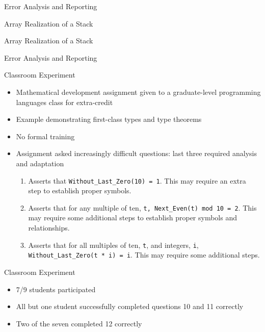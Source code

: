 \begin{frame}{Error Analysis and Reporting}
~
\end{frame}


\begin{frame}{Array Realization of a Stack}
	
\end{frame}

\begin{frame}{Array Realization of a Stack}
	
\end{frame}

\begin{frame}{Error Analysis and Reporting}
~
\end{frame}


\begin{frame}{Classroom Experiment}
	\begin{itemize}
		\item Mathematical development assignment given to a graduate-level programming languages class for extra-credit
		\item Example demonstrating first-class types and type theorems
		\item No formal training
		\item Assignment asked increasingly difficult questions: last three required analysis and adaptation\\
		\begin{enumerate}
			\item Asserts that \texttt{Without\_Last\_Zero(10)~=~1}.  This may require an extra step to establish proper symbols.
			\item Asserts that for any multiple of ten, \texttt{t,~Next\_Even(t)~mod~10~=~2}.  This may require some additional steps to establish proper symbols and relationships.
			\item Asserts that for all multiples of ten, \texttt{t}, and integers, \texttt{i}, \texttt{Without\_Last\_Zero(t~*~i)~=~i}.  This may require some additional steps.
		\end{enumerate}
	\end{itemize}
\end{frame}

\begin{frame}{Classroom Experiment}
	\begin{itemize}
		\item 7/9 students participated
		\item All but one student successfully completed questions 10 and 11 correctly
		\item Two of the seven completed 12 correctly
	\end{itemize}
\end{frame}


